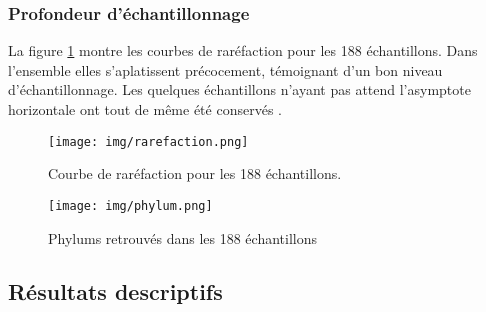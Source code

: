 \documentclass[12pt,a4paper]{article}
\begin{document}
\subsubsection{Profondeur d’échantillonnage}
La figure \ref{rarefaction} montre les courbes de raréfaction pour les 188 échantillons.
Dans l'ensemble elles s’aplatissent précocement, témoignant d’un bon niveau d'échantillonnage. Les quelques échantillons n'ayant pas attend l'asymptote horizontale ont tout de même été conservés .

\begin{figure}[!h]
\begin{center}
\texttt{[image: img/rarefaction.png]}\hfill
\end{center}
\caption{Courbe de raréfaction pour les 188 échantillons. }
\label{rarefaction}
\end{figure}


\begin{figure}[!ht]
\begin{center}
\texttt{[image: img/phylum.png]}\hfill
\end{center}
\caption{Phylums retrouvés dans les 188 échantillons}
\label{phylum}
\end{figure}

\subsection{Résultats descriptifs}
\end{document}

